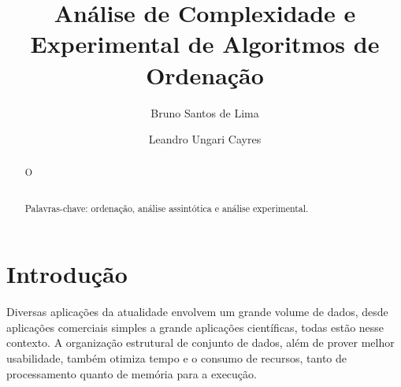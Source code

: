 \documentclass[conference]{IEEEtran}
\begin{document}
\renewcommand{\abstractname}{Resumo}
\renewcommand{\refname}{REFERÊNCIAS}
\renewcommand{\tablename}{TABELA}


\title{Análise de Complexidade e Experimental de Algoritmos de Ordenação}



\author{ 
 Bruno Santos de Lima\\ 
 \and 
 Leandro Ungari Cayres\\ 
} 



\maketitle

\begin{abstract}
O 

~\\Palavras-chave: ordenação, análise assintótica e análise experimental.

\end{abstract}


\IEEEpeerreviewmaketitle


\section{Introdução}

Diversas aplicações da atualidade envolvem um grande volume de dados, desde aplicações comerciais simples a grande aplicações científicas, todas estão nesse contexto. A organização estrutural de conjunto de dados, além de prover melhor usabilidade, também otimiza tempo e o consumo de recursos, tanto de processamento quanto de memória para a execução.
\end{document}
